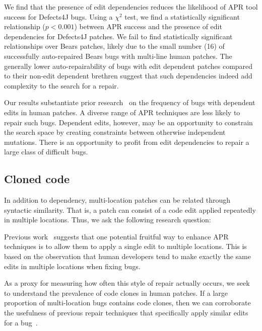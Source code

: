 \documentclass[sigconf, timestamp-false, anonymous=true]{acmart}
\begin{document}
We find that the presence of edit dependencies 
reduces the likelihood of APR tool success for Defects4J bugs.
Using a $\chi^2$ test, we find a statistically significant relationship ($p < 0.001$)
between APR success and the presence of edit dependencies for Defects4J patches. 
We fail to find statistically 
significant relationships over Bears patches, likely due to the small number (16) of 
successfully auto-repaired Bears bugs with multi-line human patches.
The generally lower auto-repairability of bugs with edit dependent patches compared 
to their non-edit dependent brethren suggest that such dependencies indeed 
add complexity to the search for a repair.

Our results substantiate prior research~\cite{zhong2015} on the frequency of 
bugs with dependent edits in human patches. A diverse range of APR 
techniques are less likely to repair such bugs. Dependent edits, however, may 
be an opportunity to constrain the search space by creating constraints between 
otherwise independent mutations. There is an opportunity to profit from edit 
dependencies to repair a large class of difficult bugs.


\subsection{Cloned code}

In addition to dependency, multi-location patches can be related through syntactic
similarity. That is, a patch can consist of a code edit applied repeatedly in
multiple locations. Thus, we ask the following research question:


Previous work~\cite{wang2018} suggests that one potential fruitful way to enhance
APR techniques is to allow them to apply a single edit to multiple locations.
This is based on the observation that human developers tend to make exactly the 
same edits in multiple locations when fixing bugs. 

As a proxy for measuring how often this style of repair actually occurs, we seek
to understand the 
prevalence of code clones in human patches. If a large proportion of multi-location bugs contains code 
clones, then we can corroborate the usefulness of previous repair techniques that specifically apply 
similar 
edits for a bug~\cite{saha2019harnessing}.
\end{document}
